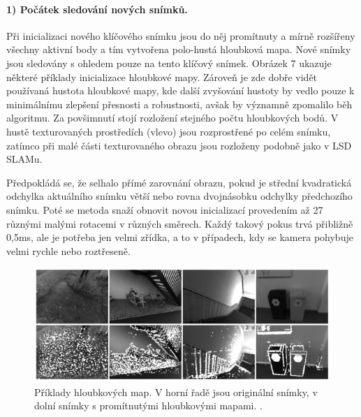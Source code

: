 \documentclass[12pt,a4paper]{article}
\begin{document}
\paragraph*{1) Počátek sledování nových snímků.} Při inicializaci nového klíčového snímku jsou do něj promítnuty a mírně rozšířeny všechny aktivní body a tím vytvořena polo-hustá hloubková mapa. Nové snímky jsou sledovány s ohledem pouze na tento klíčový snímek. Obrázek 7 ukazuje některé příklady inicializace hloubkové mapy. Zároveň je zde dobře vidět používaná hustota hloubkové mapy, kde další zvyšování hustoty by vedlo pouze k minimálnímu zlepšení přesnosti a robustnosti, avšak by významně zpomalilo běh algoritmu. Za povšimnutí stojí rozložení stejného počtu hloubkových bodů. V hustě texturovaných prostředích (vlevo) jsou rozprostřené po celém snímku, zatímco při malé části texturovaného obrazu jsou rozloženy podobně jako v LSD SLAMu.

Předpokládá se, že selhalo přímé zarovnání obrazu, pokud je střední kvadratická odchylka aktuálního snímku větší nebo rovna dvojnásobku odchylky předchozího snímku. Poté se metoda snaží obnovit novou inicializací provedením až 27 různými malými rotacemi v různých směrech. Každý takový pokus trvá přibližně 0,5ms, ale je potřeba jen velmi zřídka, a to v případech, kdy se kamera pohybuje velmi rychle nebo roztřeseně.

\begin{figure}[H]
\centering
\includegraphics[scale=0.64]{img/Obr5_b.png}
\caption{Příklady hloubkových map. V horní řadě jsou originální snímky, v dolní snímky s promítnutými hloubkovými mapami.  \cite{Engel2018_DSO}.}
\end{figure}
\end{document}
